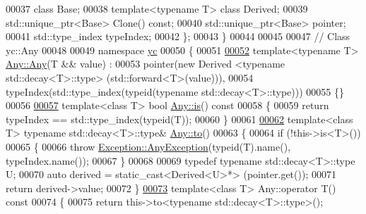 \begin{DoxyCode}
00037         \textcolor{keyword}{class }Base;
00038         \textcolor{keyword}{template}<\textcolor{keyword}{typename} T> \textcolor{keyword}{class }Derived;
00039         std::unique\_ptr<Base> Clone() \textcolor{keyword}{const};
00040         std::unique\_ptr<Base> pointer;
00041         std::type\_index typeIndex;
00042     \};
00043 \}
00044 
00045 
00047 \textcolor{comment}{//  Class yc::Any}
00048 
00049 \textcolor{keyword}{namespace }\hyperlink{namespaceyc}{yc}
00050 \{
00051     
\hypertarget{_any_8h_source_l00052}{}\hyperlink{classyc_1_1_any_a55eb7a9883b93f61c051bdc0f67ab667}{00052}     \textcolor{keyword}{template}<\textcolor{keyword}{typename} T> \hyperlink{classyc_1_1_any_ad8fcf7b262813c063a49dfc91a88e771}{Any::Any}(T && value) :
00053         pointer(new Derived <typename std::decay<T>::type> (std::forward<T>(value))),
00054         typeIndex(std::type\_index(typeid(typename std::decay<T>::type)))
00055     \{\}
00056     
\hypertarget{_any_8h_source_l00057}{}\hyperlink{classyc_1_1_any_aa70f1a046474d7b621331e44fdb6c20a}{00057}     \textcolor{keyword}{template}<\textcolor{keyword}{class} T> \textcolor{keywordtype}{bool} \hyperlink{classyc_1_1_any_aa70f1a046474d7b621331e44fdb6c20a}{Any::is}()\textcolor{keyword}{ const}
00058 \textcolor{keyword}{    }\{
00059         \textcolor{keywordflow}{return} typeIndex == std::type\_index(\textcolor{keyword}{typeid}(T));
00060     \}
00061     
\hypertarget{_any_8h_source_l00062}{}\hyperlink{classyc_1_1_any_a3db663604505ef8d7e84dd41d5bfcc75}{00062}     \textcolor{keyword}{template}<\textcolor{keyword}{class} T> \textcolor{keyword}{typename} std::decay<T>::type& \hyperlink{classyc_1_1_any_a3db663604505ef8d7e84dd41d5bfcc75}{Any::to}()
00063     \{
00064         \textcolor{keywordflow}{if} (!this->is<T>())
00065         \{
00066             \textcolor{keywordflow}{throw} \hyperlink{classyc_1_1_exception_1_1_any_exception}{Exception::AnyException}(\textcolor{keyword}{typeid}(T).name(), typeIndex.name());
00067         \}
00068         
00069         \textcolor{keyword}{typedef} \textcolor{keyword}{typename} std::decay<T>::type U;
00070         \textcolor{keyword}{auto} derived = \textcolor{keyword}{static\_cast<}Derived<U>*\textcolor{keyword}{>} (pointer.get());
00071         \textcolor{keywordflow}{return} derived->value;
00072     \}
\hypertarget{_any_8h_source_l00073}{}\hyperlink{classyc_1_1_any_a93c8a2b87ab82f62c3757af23981002e}{00073}     \textcolor{keyword}{template}<\textcolor{keyword}{class} T> Any::operator T()\textcolor{keyword}{ const}
00074 \textcolor{keyword}{    }\{
00075         \textcolor{keywordflow}{return} this->to<typename std::decay<T>::type>();

\end{DoxyCode}
